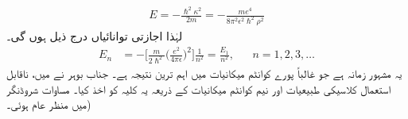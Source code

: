  \begin{align}
E=-\frac{\hslash^{2}\kappa ^{2}}{2m}=-\frac{me^{4}}{8\pi^{2}\epsilon^{2}\hslash^{2}\rho^{2}} 
\end{align}
 لہٰذا اجازتی توانائیاں درج ذیل ہوں گی۔ 
 \begin{align}\label{مساوات_ابعادی_ہائیڈروجن_اجازتی_توانائیاں}
E_{n}&=-\big[\frac{m}{2\hslash^{2}}\big(\frac{e^{2}}{4\pi\epsilon}\big)^{2}\big]\frac{1}{n^{2}}=\frac{E_{1}}{n^{2}}, && n=1,2,3,\dotsc
\end{align}
 یہ مشہور  زمانہ  ہے جو غالباً پورے کوانٹم میکانیات میں  اہم ترین نتیجہ ہے۔ جناب بوہر نے  میں،  ناقابل استعمال کلاسیکی طبیعیات اور نیم کوانٹم میکانیات کے ذریعہ  یہ کلیہ کو اخذ کیا۔ مساوات شروڈنگر  میں منظر عام ہوئی۔)

